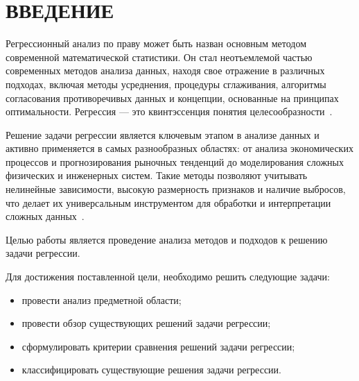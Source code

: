 \chapter*{ВВЕДЕНИЕ}

Регрессионный анализ по праву может быть назван основным методом современной математической статистики.
Он стал неотъемлемой частью современных методов анализа данных, находя свое отражение в различных подходах, включая методы усреднения, процедуры сглаживания, алгоритмы согласования противоречивых данных и концепции, основанные на принципах оптимальности.
Регрессия --- это квинтэссенция понятия целесообразности~\cite{norman}.

Решение задачи регрессии является ключевым этапом в анализе данных и активно применяется в самых разнообразных областях: от анализа экономических процессов и прогнозирования рыночных тенденций до моделирования сложных физических и инженерных систем.
Такие методы позволяют учитывать нелинейные зависимости, высокую размерность признаков и наличие выбросов, что делает их универсальным инструментом для обработки и интерпретации сложных данных~\cite{bishop}.

Целью работы является проведение анализа методов и подходов к решению задачи регрессии.

Для достижения поставленной цели, необходимо решить следующие задачи:
\begin{itemize}
    \item провести анализ предметной области;
    \item провести обзор существующих решений задачи регрессии;
    \item сформулировать критерии сравнения решений задачи регрессии;
    \item классифицировать существующие решения задачи регрессии.
\end{itemize}
